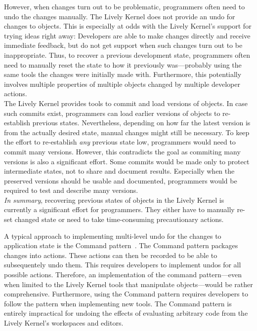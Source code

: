 However, when changes turn out to be problematic, programmers often need to undo the changes manually.
The Lively Kernel does not provide an undo for changes to objects.
This is especially at odds with the Lively Kernel's support for trying ideas right away: Developers are able to make changes directly and receive immediate feedback, but do not get support when such changes turn out to be inappropriate.
Thus, to recover a previous development state, programmers often need to manually reset the state to how it previously was---probably using the same tools the changes were initially made with.
Furthermore, this potentially involves multiple properties of multiple objects changed by multiple developer actions.\\
The Lively Kernel provides tools to commit and load versions of objects.
In case such commits exist, programmers can load earlier versions of objects to re-establish previous states.
Nevertheless, depending on how far the latest version is from the actually desired state, manual changes might still be necessary.
To keep the effort to re-establish \emph{any} previous state low, programmers would need to commit many versions.
However, this contradicts the goal as commiting many versions is also a significant effort.
Some commits would be made only to protect intermediate states, not to share and document results.
Especially when the preserved versions should be usable and documented, programmers would be required to test and describe many versions.\\
\emph{In summary}, recovering previous states of objects in the Lively Kernel is currently a significant effort for programmers.
They either have to manually re-set changed state or need to take time-consuming precautionary actions.

A typical approach to implementing multi-level undo for the changes to application state is the Command pattern~\cite{GammaHelmJohnsonVlissides95}.
The Command pattern packages changes into actions.
These actions can then be recorded to be able to subsequentely undo them.
This requires developers to implement undos for all possible actions.
Therefore, an implementation of the command pattern---even when limited to the Lively Kernel tools that manipulate objects---would be rather comprehensive.
Furthermore, using the Command pattern requires developers to follow the pattern when implementing new tools.
The Command pattern is entirely impractical for undoing the effects of evaluating arbitrary code from the Lively Kernel's workspaces and editors.

